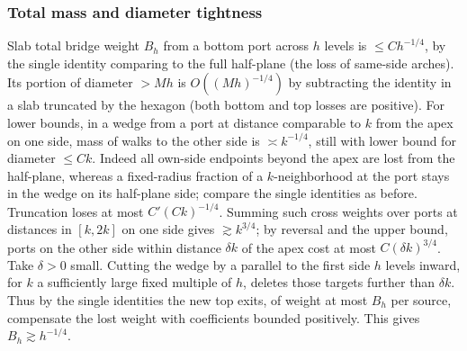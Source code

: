 \subsubsection{Total mass and diameter tightness}
Slab total bridge weight \(B_h\) from a bottom port across \(h\) levels is \(\le C h^{-1/4}\), by the single identity comparing to the full half-plane (the loss of same-side arches). Its portion of diameter \(>M h\) is \(O((M h)^{-1/4})\) by subtracting the identity in a slab truncated by the hexagon (both bottom and top losses are positive). For lower bounds, in a wedge from a port at distance comparable to \(k\) from the apex on one side, mass of walks to the other side is \(\asymp k^{-1/4}\), still with lower bound for diameter \(\le C k\). Indeed all own-side endpoints beyond the apex are lost from the half-plane, whereas a fixed-radius fraction of a \(k\)-neighborhood at the port stays in the wedge on its half-plane side; compare the single identities as before. Truncation loses at most \(C'(C k)^{-1/4}\). Summing such cross weights over ports at distances in \([k,2k]\) on one side gives \(\gtrsim k^{3/4}\); by reversal and the upper bound, ports on the other side within distance \(\delta k\) of the apex cost at most \(C(\delta k)^{3/4}\). Take \(\delta>0\) small. Cutting the wedge by a parallel to the first side \(h\) levels inward, for \(k\) a sufficiently large fixed multiple of \(h\), deletes those targets further than \(\delta k\). Thus by the single identities the new top exits, of weight at most \(B_h\) per source, compensate the lost weight with coefficients bounded positively. This gives \(B_h\gtrsim h^{-1/4}\).

